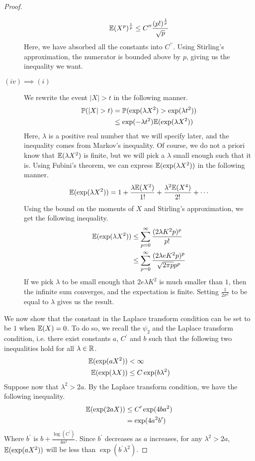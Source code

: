 \documentclass[11pt]{article}
\begin{document}
\begin{proof}
\begin{description}
    \begin{align*}
      \mathbb{E}(X^p)^{\frac{1}{p}} \leq C^{\prime \prime} \frac{(p!)^{\frac{1}{p}}}{\sqrt{p}}
    \end{align*}
    Here, we have absorbed all the constants into $C^{\prime \prime}$.
    Using Stirling's approximation, the numerator is bounded above by $p$, giving us the inequality we want.
  \item[$(iv) \implies (i)$] We rewrite the event $|X| > t$ in the following manner.
    \begin{align*}
      \mathbb{P}(|X| > t) &= \mathbb{P}(\exp(\lambda X^2) > \exp(\lambda t^2)) \\
                  &\leq \exp(-\lambda t^2) \mathbb{E}(\exp(\lambda X^2))
    \end{align*}
    Here, $\lambda$ is a positive real number that we will specify later, and the inequality comes from Markov's inequality.
    Of course, we do not a priori know that $\mathbb{E}(\lambda X^2)$ is finite, but we will pick a $\lambda$ small enough such that it is.
    Using Fubini's theorem, we can express $\mathbb{E}(\exp(\lambda X^2))$ in the following manner.
    \begin{align*}
      \mathbb{E}(\exp(\lambda X^2)) = 1 + \frac{\lambda \mathbb{E}(X^2)}{1!} + \frac{\lambda^2 \mathbb{E}(X^4)}{2!} + \cdots
    \end{align*}
    Using the bound on the moments of $X$ and Stirling's approximation, we get the following inequality.
    \begin{align*}
      \mathbb{E}(\exp(\lambda X^2)) &\leq \sum_{p=0}^{\infty} \frac{(2\lambda K^2p)^p}{p!} \\
                            &\leq \sum_{p=0}^{\infty} \frac{(2\lambda e K^2 p)^p}{\sqrt{2\pi p} p ^p}
    \end{align*}
    If we pick $\lambda$ to be small enough that $2e \lambda K^2$ is much smaller than $1$, then the infinite sum converges, and the expectation is finite.
    Setting $\frac{1}{2\sigma^2}$ to be equal to $\lambda$ gives us the result.
  \end{description}
  We now show that the constant in the Laplace transform condition can be set to be $1$ when $\mathbb{E}(X) = 0$.
  To do so, we recall the $\psi_2$ and the Laplace transform condition, i.e. there exist constants $a$, $C^{\prime}$ and $b$ such that the following two inequalities hold for all $\lambda \in \mathbb{R}$.
  \begin{align}
    \label{eq:1}
    \mathbb{E}(\exp(aX^2)) &< \infty \\
    \mathbb{E}(\exp(\lambda X)) & \leq C \exp(b\lambda^2)
  \end{align}
  Suppose now that $\lambda^2 > 2a$.
  By the Laplace transform condition, we have the following inequality.
  \begin{align*}
    \mathbb{E}(\exp(2aX)) &\leq C^{\prime} \exp(4ba^2) \\
                  &= \exp(4a^2 b^{\prime})
  \end{align*}
  Where $b^{\prime}$ is $b + \frac{\log(C^{\prime})}{4a^2}$.
  Since $b^{\prime}$ decreases as $a$ increases, for any $\lambda^2 > 2a$, $\mathbb{E}(\exp(aX^2))$ will be less than $\exp(b^{\prime} \lambda^2)$.


\end{proof}
\end{document}

